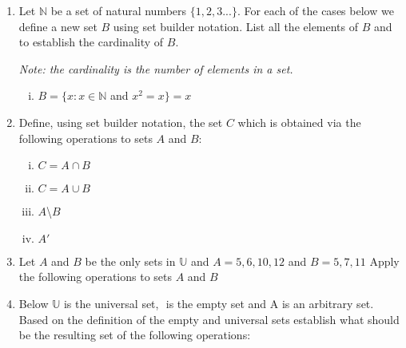 \documentclass[]{article}
\begin{document}
\begin{enumerate}
\vspace{0.5 cm}




\item Let $\mathbb{N}$ be a set of natural numbers $\{ 1, 2, 3 ...\}.$ For each of the cases below we define 
    a new set $B$ using set builder notation. List all the elements of $B$ and to establish the cardinality of $B$.
     
    \textit{Note: the cardinality is the number of elements in a set.}


    \begin{enumerate}[i.]
        \item $B = \{ x : x \in \mathbb{N} $ and $ x^2 = x\} = x$
    \end{enumerate}




















    \item Define, using set builder notation, the set $C$ which is obtained via the following operations to sets $A$ and $B$:
    \begin{enumerate}[i.]
        \item $C = A \cap B$ 
        \item $C = A \cup B$
        \item $A$\textbackslash $B$ 
        \item $A'$  
    \end{enumerate}

\vspace{0.5 cm}
    \item Let $A$ and $B$ be the only sets in $\mathbb{U}$ and $A = {5, 6, 10, 12}$ and $B = {5, 7, 11}$ Apply the following operations to sets $A$ and $B$

\vspace{0.5 cm}

    \item Below $\mathbb{U}$ is the universal set, ${}$ is the empty set and A is an arbitrary set. Based on the definition of the empty and universal sets establish what should be the resulting set of the following operations:
        


\end{enumerate}
\end{document}

